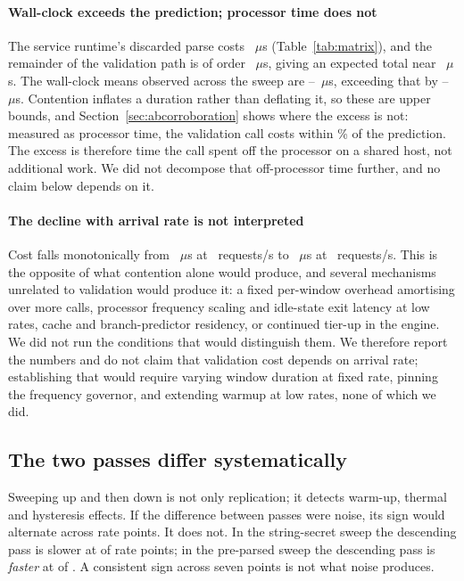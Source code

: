 \documentclass[preprint,12pt,authoryear]{elsarticle}
\begin{document}
\paragraph{Wall-clock exceeds the prediction; processor time does not} The
service runtime's discarded parse costs \NodeEighteenProbeThrows~$\mu$s
(Table~\ref{tab:matrix}), and the remainder of the validation path is of order
\NodeEighteenJwtPreparsed~$\mu$s, giving an expected total near
\InsituPredictedFromMatrix~$\mu$s. The wall-clock means observed across the
sweep are \InsituObservedLo--\InsituObservedHi~$\mu$s, exceeding that by
\InsituUnaccountedLo--\InsituUnaccountedHi~$\mu$s. Contention inflates a
duration rather than deflating it, so these are upper bounds, and
Section~\ref{sec:abcorroboration} shows where the excess is not: measured as
processor time, the validation call costs within \AbCpuVsPredictedPct\% of the
prediction. The excess is therefore time the call spent off the processor on a
shared host, not additional work. We did not decompose that off-processor time
further, and no claim below depends on it.

\paragraph{The decline with arrival rate is not interpreted} Cost falls
monotonically from \InsituStringAscA~$\mu$s at \InsituRateA~requests/s to
\InsituStringAscG~$\mu$s at \InsituRateG~requests/s. This is the opposite of what
contention alone would produce, and several mechanisms unrelated to validation
would produce it: a fixed per-window overhead amortising over more calls,
processor frequency scaling and idle-state exit latency at low rates, cache and
branch-predictor residency, or continued tier-up in the engine. We did not run
the conditions that would distinguish them. We therefore report the numbers and
do not claim that validation cost depends on arrival rate; establishing that
would require varying window duration at fixed rate, pinning the frequency
governor, and extending warmup at low rates, none of which we did.

\subsection{The two passes differ systematically}\label{sec:drift}

Sweeping up and then down is not only replication; it detects warm-up, thermal
and hysteresis effects. If the difference between passes were noise, its sign
would alternate across rate points. It does not. In the string-secret sweep the
descending pass is slower at \InsituStringSameSign{} of \InsituStringPoints{}
rate points; in the pre-parsed sweep the descending pass is \emph{faster} at
\InsituPreparsedSameSign{} of \InsituPreparsedPoints. A consistent sign across
seven points is not what noise produces.
\end{document}
